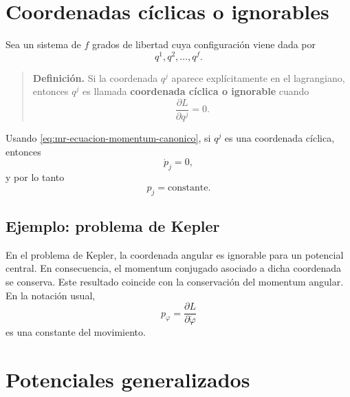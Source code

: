 \documentclass[../apunte_mecanica_clasica.tex]{subfiles}%
\begin{document}
\section{Coordenadas cíclicas o ignorables}
\label{sec:mr-coordenadas-ciclicas}

Sea un sistema de $f$ grados de libertad cuya configuración viene dada por
\begin{equation}
    q^1,q^2,\dots,q^f.
    \label{eq:mr-configuracion-f-grados}
\end{equation}

\begin{quote}
\textbf{Definición.} Si la coordenada $q^j$ aparece explícitamente en el lagrangiano, entonces $q^j$ es llamada \textbf{coordenada cíclica o ignorable} cuando
\begin{equation}
    \frac{\partial L}{\partial q^j}=0.
    \label{eq:mr-coordenada-ciclica}
\end{equation}
\end{quote}

Usando \eqref{eq:mr-ecuacion-momentum-canonico}, si $q^j$ es una coordenada cíclica, entonces
\begin{equation}
    \dot p_j=0,
    \label{eq:mr-momentum-conservado-ciclica}
\end{equation}
y por lo tanto
\begin{equation}
    p_j=\text{constante}.
    \label{eq:mr-p-conservado}
\end{equation}

\subsection{Ejemplo: problema de Kepler}
\label{subsec:mr-ejemplo-kepler}

En el problema de Kepler, la coordenada angular es ignorable para un potencial central. En consecuencia, el momentum conjugado asociado a dicha coordenada se conserva. Este resultado coincide con la conservación del momentum angular. En la notación usual,
\begin{equation}
    p_\varphi=\frac{\partial L}{\partial \dot\varphi}
    \label{eq:mr-momentum-angular-kepler}
\end{equation}
es una constante del movimiento.

\section{Potenciales generalizados}
\label{sec:mr-potenciales-generalizados}
\end{document}
